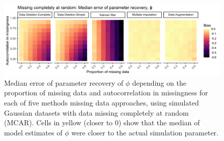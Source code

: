 \documentclass{article}
\begin{document}
\begin{figure}
    \noindent\includegraphics[width = \textwidth]{Figures/MockedUpFigures/heatmap_GaussianMCAR_justPhi.png}

    \caption{Median error of parameter recovery of $\phi$ depending on the proportion of missing data and autocorrelation in missingness for each of five methods missing data approaches, using simulated Gaussian datasets with data missing completely at random (MCAR). Cells in yellow (closer to 0) show that the median of model estimates of $\phi$  were closer to the actual simulation parameter.}

    \label{fig:heatMap_gauss_MAR}
\end{figure}
\end{document}
